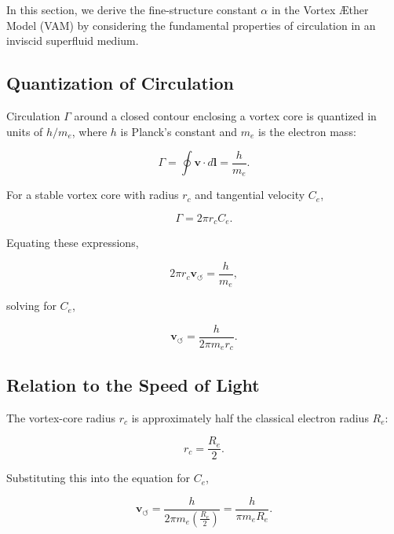 \documentclass[a4paper,12pt]{article}
\begin{document}
In this section, we derive the fine-structure constant $\alpha$ in the Vortex Æther Model (VAM) by considering the fundamental properties of circulation in an inviscid superfluid medium.

\subsection{Quantization of Circulation}

Circulation $\Gamma$ around a closed contour enclosing a vortex core is quantized in units of $h/m_e$, where $h$ is Planck's constant and $m_e$ is the electron mass:

\begin{equation}
    \Gamma = \oint \mathbf{v} \cdot d\mathbf{l} = \frac{h}{m_e}.
\end{equation}

For a stable vortex core with radius $r_c$ and tangential velocity $C_e$,

\begin{equation}
    \Gamma = 2 \pi r_c C_e.
\end{equation}

Equating these expressions,

\begin{equation}
    2 \pi r_c \mathbf{v}_{\scriptscriptstyle\boldsymbol{\circlearrowleft}} = \frac{h}{m_e},
\end{equation}

solving for $C_e$,

\begin{equation}
    \mathbf{v}_{\scriptscriptstyle\boldsymbol{\circlearrowleft}} = \frac{h}{2 \pi m_e r_c}.
\end{equation}

\subsection{Relation to the Speed of Light}

The vortex-core radius $r_c$ is approximately half the classical electron radius $R_e$:

\begin{equation}
    r_c = \frac{R_e}{2}.
\end{equation}

Substituting this into the equation for $C_e$,

\begin{equation}
    \mathbf{v}_{\scriptscriptstyle\boldsymbol{\circlearrowleft}} = \frac{h}{2 \pi m_e \left(\frac{R_e}{2}\right)} = \frac{h}{\pi m_e R_e}.
\end{equation}
\end{document}
